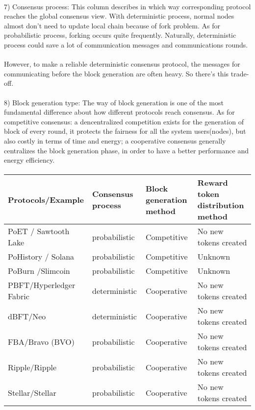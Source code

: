 \documentclass[]{article}
\begin{document}
\begin{CJK*}{UTF8}{gbsn}
	 \paragraph{}
7) Consensus process: This column describes in which way corresponding protocol reaches the global consensus view. With deterministic process, normal nodes almost don't need to update local chain because of fork problem. As for probabilistic process, forking occurs quite frequently. Naturally, deterministic process could save a lot of communication messages and communications rounds.
 \paragraph{}
 However, to make a reliable deterministic consensus protocol, the messages for communicating before the block generation are often heavy. So there's this trade-off.
	 \paragraph{}
8) Block generation type: The way of block generation is one of the most fundamental difference about how different protocols reach consensus. As for competitive consensus: a dencentralized competition exists for the generation of block of every round, it protects the fairness for all the system users(nodes), but also costly in terms of time and energy; a cooperative consensus generally centralizes the block generation phase, in order to have a better performance and energy efficiency.

\paragraph{}
\begin{tabular}{p{2cm}p{3cm}p{3cm}p{3cm}}
\hline
Protocols/E\-xample  & Consensus process & Block generation method & Reward token distribution method \\ \hline
PoET / Sawtooth Lake & probabilistic & Competitive & No new tokens created \\ \hline

PoHistory / Solana & probabilistic & Competitive & Unknown \\ \hline
PoBurn /\newline Slimcoin & probabilistic & Competitive &  Unknown  \\ \hline
PBFT/Hyp\-erledger Fabric & deterministic & Cooperative & No new tokens created  \\ \hline
dBFT/Neo & deterministic & Cooperative & No new tokens created   \\ \hline
FBA/Bravo (BVO) & probabilistic & Cooperative & No new tokens created  \\ \hline
Ripple/Ripple & probabilistic & Cooperative & No new tokens created  \\ \hline
Stellar/Stellar & probabilistic & Cooperative & No new tokens created   \\ \hline
\end{tabular}

\end{CJK*}
\end{document}
